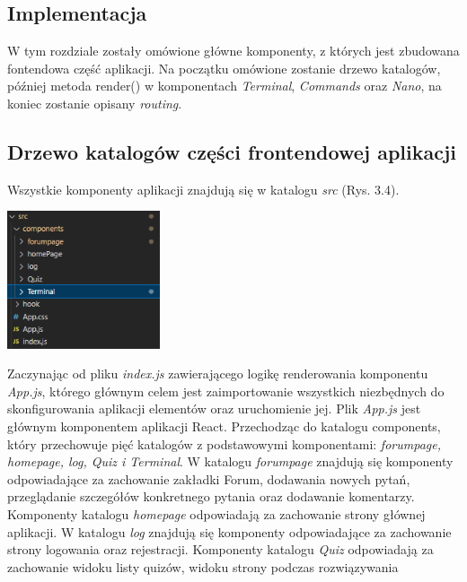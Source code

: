 \documentclass[10pt,a4paper]{report}
\begin{document}
\begin{adjustwidth}{2cm}{2cm}
\section{Implementacja}
\begin{minipage}{1\linewidth}
W tym rozdziale zostały omówione główne komponenty, z których jest zbudowana  fontendowa część aplikacji. Na początku omówione zostanie drzewo katalogów, później metoda render() w komponentach \textit{Terminal}, \textit{Commands} oraz \textit{Nano}, na koniec zostanie opisany \textit{routing}. 
\end{minipage}
\subsection{Drzewo katalogów części frontendowej aplikacji}
\begin{minipage}{1\linewidth}
Wszystkie komponenty aplikacji  znajdują się w katalogu \textit{src} (Rys. 3.4).\\
\end{minipage}
 \begin{minipage}{\linewidth}
\begin{center}
  \includegraphics[width=170px]{code/drzewo.png}
\end{center}
\end{minipage}
\begin{minipage}{1\linewidth}
\vspace{0.3cm}
Zaczynając od pliku \textit{index.js} zawierającego logikę renderowania komponentu \textit{App.js}, którego głównym celem jest zaimportowanie wszystkich niezbędnych do skonfigurowania aplikacji elementów oraz uruchomienie jej. Plik \textit{App.js} jest głównym komponentem aplikacji React. Przechodząc do katalogu components, który przechowuje pięć katalogów z podstawowymi komponentami: \textit{forumpage, homepage, log, Quiz i Terminal}. W katalogu \textit{forumpage} znajdują się komponenty odpowiadające za zachowanie zakładki Forum, dodawania nowych pytań, przeglądanie szczegółów konkretnego pytania oraz dodawanie komentarzy. Komponenty katalogu \textit{homepage} odpowiadają za zachowanie strony głównej aplikacji. W katalogu \textit{log} znajdują się komponenty odpowiadające za zachowanie strony logowania oraz rejestracji. Komponenty katalogu \textit{Quiz} odpowiadają za  zachowanie widoku listy quizów, widoku strony podczas rozwiązywania 

\end{minipage}
\end{adjustwidth}
\end{document}
